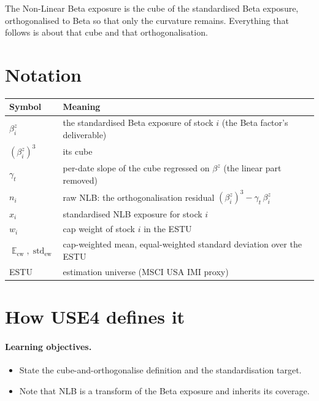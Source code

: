 \documentclass[11pt]{article}
\theoremstyle{definition}
\theoremstyle{plain}
\theoremstyle{remark}
\DeclareMathOperator{\std}{std}
\DeclareMathOperator*{\avg}{\mathbb{E}}
\begin{document}
\begin{keyresult}
The Non-Linear Beta exposure is the cube of the standardised Beta exposure, orthogonalised to Beta so that only the curvature remains. Everything that follows is about that cube and that orthogonalisation.
\end{keyresult}

\section*{Notation}

\begin{center}
\begin{tabular}{@{}ll@{}}
\toprule
Symbol & Meaning \\
\midrule
$\beta^{z}_i$ & the standardised Beta exposure of stock $i$ (the Beta factor's deliverable) \\
$(\beta^{z}_i)^{3}$ & its cube \\
$\gamma_t$ & per-date slope of the cube regressed on $\beta^{z}$ (the linear part removed) \\
$n_i$ & raw NLB: the orthogonalisation residual $(\beta^{z}_i)^{3} - \gamma_t\,\beta^{z}_i$ \\
$x_i$ & standardised NLB exposure for stock $i$ \\
$w_i$ & cap weight of stock $i$ in the ESTU \\
$\avg_{\text{cw}}, \std_{\text{ew}}$ & cap-weighted mean, equal-weighted standard deviation over the ESTU \\
ESTU & estimation universe (MSCI USA IMI proxy) \\
\bottomrule
\end{tabular}
\end{center}

\section{How USE4 defines it}\label{sec:def}

\paragraph{Learning objectives.}
\begin{itemize}[leftmargin=1.4em,topsep=2pt]
  \item State the cube-and-orthogonalise definition and the standardisation target.
  \item Note that NLB is a transform of the Beta exposure and inherits its coverage.
\end{itemize}
\end{document}
